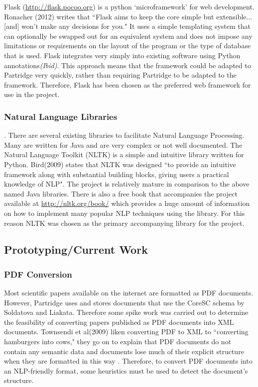 \documentclass[12pt,a4paper]{article}
\begin{document}
Flask (\url{http://flask.pocoo.org}) is a python `microframework' for web
development. Ronacher (2012) writes that ``Flask aims to keep the core simple
but extensible...[and] won't make any decisions for you\cite{flask2012}." It
uses a simple templating system that can optionally be swapped out for an
equivalent system and does not impose any limitations or requirements on the
layout of the program or the type of database that is used. Flask integrates
very simply into existing software using Python annotations\emph{(Ibid)}. This approach
means that the framework could be adapted to Partridge very quickly, rather
than requiring Partridge to be adapted to the framework. Therefore, Flask has
been chosen as the preferred web framework for use in the project.

\subsubsection{Natural Language Libraries} \label{sec:libschoice}.  There are
several existing libraries to facilitate Natural Language Processing.  Many are
written for Java \cite{mallet2002}\cite{cunningham2011text} and are very
complex or not well documented. The Natural Language Toolkit (NLTK) is a simple
and intuitive library written for Python. Bird(2009) states that NLTK was
designed ``to provide an intuitive framework along with substantial building
blocks, giving users a practical knowledge of NLP\cite{bird2009natural}". The
project is relatively mature in comparison to the above named Java libraries.
There is also a free book that accompanies the project available at
\url{http://nltk.org/book/} which provides a huge amount of information on how
to implement many popular NLP techniques using the library. For this reason
NLTK was chosen as the primary accompanying library for the project.

\subsection{Prototyping/Current Work}

\subsubsection{PDF Conversion}
Most scientific papers available on the internet are formatted as PDF
documents. However, Partridge uses and stores documents that use the CoreSC
schema by Soldatova and Liakata\cite{liakata2008guidelines}. Therefore some
spike work was carried out to determine the feasibility of converting papers
published as PDF documents into XML documents. Townsendi et al(2009) liken converting
PDF to XML to ``converting hamburgers into cows," they go on to explain that
PDF documents do not contain any semantic data and documents lose much of their
explicit structure when they are formatted in this way \cite{Townsend2009}.
Therefore, to convert PDF documents into an NLP-friendly format, some
heuristics must be used to detect the document's structure\cite{pdfminer}. 
\end{document}
